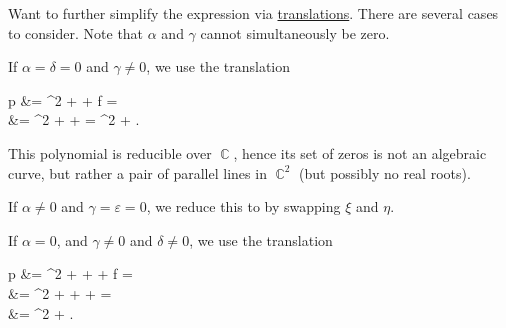 \begin{algorithm}
  Want to further simplify the expression via \hyperref[def:rigid_motion/translation]{translations}. There are several cases to consider. Note that \( \alpha \) and \( \gamma \) cannot simultaneously be zero.

  \begin{thmenum}
     If \( \alpha = \delta = 0 \) and \( \gamma \neq 0 \), we use the translation
    \begin{balign*}
      p\parens*{ \xi, \eta - \frac \varepsilon {2 \gamma} }
      &=
      \gamma \parens*{ \eta - \frac \varepsilon {2 \gamma} }^2 + \varepsilon \parens*{ \eta - \frac \varepsilon {2 \gamma} } + f
      = \\ &=
      \gamma \eta^2 + \parens[\Big]{ 2 \gamma \cdot \frac {-\varepsilon} {2 \gamma} + \varepsilon } \eta + 
      =
      \gamma \eta^2 + .
    \end{balign*}

    This polynomial is reducible over \( \BbbC \), hence its set of zeros is not an algebraic curve, but rather a pair of parallel lines in \( \BbbC^2 \) (but possibly no real roots).

     If \( \alpha \neq 0 \) and \( \gamma = \varepsilon = 0 \), we reduce this to  by swapping \( \xi \) and \( \eta \).

     If \( \alpha = 0 \), and \( \gamma \neq 0 \) and \( \delta \neq 0 \), we use the translation
    \begin{balign*}
      p
      &=
      \gamma \parens*{ \eta - \frac \varepsilon {2 \gamma} }^2 + \delta {} + \varepsilon \parens*{ \eta - \frac \varepsilon {2 \gamma} } + f
      = \\ &=
      \gamma \eta^2 + \delta {} + \parens[\Big]{ 2 \gamma \cdot \frac {-\varepsilon} {2 \gamma} + \varepsilon } \eta + 
      = \\ &=
      \gamma \eta^2 + \delta \xi.
    \end{balign*}


\end{thmenum}
\end{algorithm}
